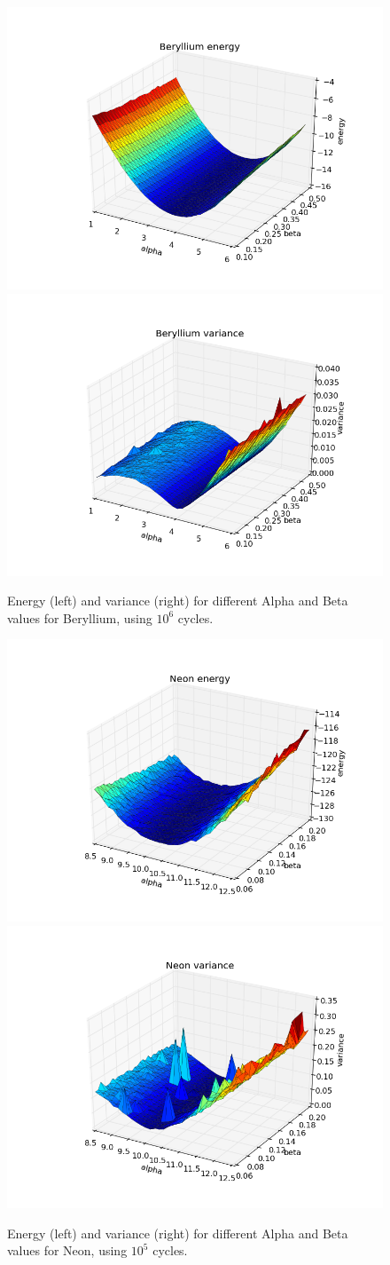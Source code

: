 \documentclass[x11names]{article}
\begin{document}
			\begin{figure}
				\centering \includegraphics[width=0.45\linewidth]{../figures/Beryllium_alpha_beta_energy}
				\centering \includegraphics[width=0.45\linewidth]{../figures/Beryllium_alpha_beta_variance}
				\protect\caption{Energy (left) and variance (right) for different Alpha and Beta values for Beryllium, using $10^{6}$ cycles.}
				\label{fig:alpha_beta_comparison_beryllium}
			\end{figure}

			\begin{figure}
				\centering \includegraphics[width=0.45\linewidth]{../figures/Neon_alpha_beta_energy}
				\centering \includegraphics[width=0.45\linewidth]{../figures/Neon_alpha_beta_variance}
				\protect\caption{Energy (left) and variance (right) for different Alpha and Beta values for Neon, using $10^{5}$ cycles.}
				\label{fig:alpha_beta_comparison_neon}
			\end{figure}
\end{document}
